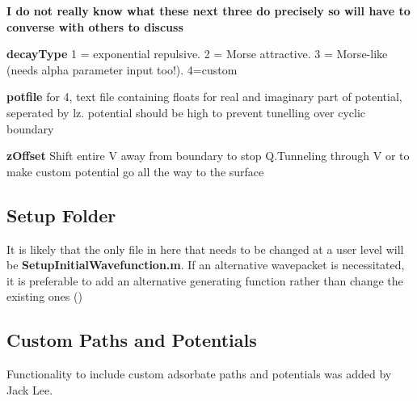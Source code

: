 \documentclass[11pt,letterpaper]{article}
\renewcommand{\\}{\bigskip}
\begin{document}
\textbf{I do not really know what these next three do precisely so will have to converse with others to discuss}\\

\textbf{decayType}  1 = exponential repulsive. 2 = Morse attractive. 3 = Morse-like (needs alpha parameter input too!). 4=custom\\
    
\textbf{potfile} for 4, text file containing floats for real and imaginary part of potential, seperated by lz. potential should be high to prevent tunelling over cyclic boundary\\

\textbf{zOffset} Shift entire V away from boundary to stop Q.Tunneling through V or to make custom potential go all the way to the surface\\

\subsection{Setup Folder}

It is likely that the only file in here that needs to be changed at a user level will be \textbf{SetupInitialWavefunction.m}. If an alternative wavepacket is necessitated, it is preferable to add an alternative generating function rather than change the existing ones (\textbf{})

\label{sec:custompaths}
\subsection{Custom Paths and Potentials}
Functionality to include custom adsorbate paths and potentials was added by Jack Lee.
\end{document}
